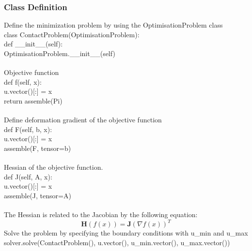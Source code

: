 \documentclass[12pt,3p]{article}
\begin{document}
\subsubsection{Class Definition}
Define the minimization problem by using the OptimisationProblem class \\
{\selectfont
class ContactProblem(OptimisationProblem): \\
\indent \indent def \_\_init\_\_(self): \\
\indent \indent \indent \indent OptimisationProblem.\_\_init\_\_(self) \\ \\
} 
Objective function \\
{\selectfont
\indent \indent  def f(self, x): \\
\indent \indent \indent \indent u.vector()[:] = x \\
\indent \indent \indent \indent return assemble(Pi) \\ \\
}
Define deformation gradient of the objective function \\
{\selectfont
\indent \indent def F(self, b, x): \\
\indent \indent \indent \indent u.vector()[:] = x \\
\indent \indent \indent \indent assemble(F, tensor=b) \\ \\
}
Hessian of the objective function. \\
{\selectfont
\indent \indent def J(self, A, x): \\
\indent \indent \indent \indent u.vector()[:] = x \\
\indent \indent \indent \indent assemble(J, tensor=A) \\ \\
}
The Hessian is related to the Jacobian by the following equation:
\begin{equation*}
\mathbf{H}(f(x)) = \mathbf{J} (\nabla f(x))^T
\end{equation*}
Solve the problem by specifying the boundary conditions with u\_min and u\_max  \\
{\selectfont
solver.solve(ContactProblem(), u.vector(), u\_min.vector(), u\_max.vector())
}
\end{document}
